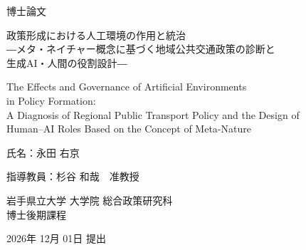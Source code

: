 
\begin{titlepage}
\begin{center}

\vspace*{2cm}

{\Huge 博士論文}

\vspace{2cm}

{\LARGE 政策形成における人工環境の作用と統治\\[0.5em]
―メタ・ネイチャー概念に基づく地域公共交通政策の診断と\\[0.3em]
生成AI・人間の役割設計―}

\vspace{1cm}

{\large The Effects and Governance of Artificial Environments \\[0.3em]
in Policy Formation: \\[0.3em]
A Diagnosis of Regional Public Transport Policy and the Design of \\[0.3em]
Human--AI Roles Based on the Concept of Meta-Nature}

\vspace{2.5cm}

{\Large 氏名：永田 右京}

\vspace{1cm}

{\Large 指導教員：杉谷 和哉　准教授}

\vspace{2cm}

{\Large 岩手県立大学 大学院 総合政策研究科\\
博士後期課程}

\vspace{2cm}

{\Large 2026年 12月 01日 提出}

\end{center}
\end{titlepage}

